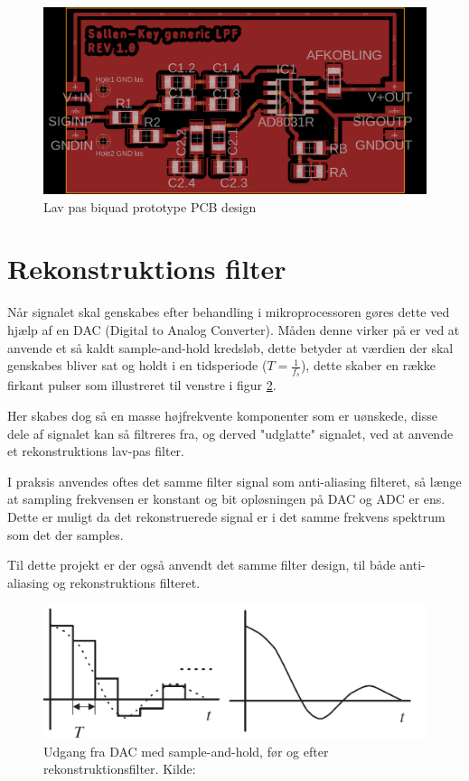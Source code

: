 \begin{figure}[H]
	\centering
	\includegraphics[width=.7\linewidth]{billeder/skbiquadpcb}
	\caption{Lav pas biquad prototype PCB design}
	\label{fig:skbiquadpcb}
\end{figure}

\section{Rekonstruktions filter}

Når signalet skal genskabes efter behandling i mikroprocessoren gøres dette ved hjælp af en DAC (Digital to Analog Converter). 
Måden denne virker på er ved at anvende et så kaldt sample-and-hold kredsløb,
dette betyder at værdien der skal genskabes bliver sat og holdt i en
tidsperiode ($T=\frac{1}{f_s}$), dette skaber en række firkant pulser som
illustreret til venstre i figur \ref{fig:samplholdrecon}.

Her skabes dog så en masse højfrekvente komponenter som er uønskede, disse dele af signalet kan så filtreres fra, og derved "udglatte" signalet, ved at anvende et rekonstruktions lav-pas filter.

I praksis anvendes oftes det samme filter signal som anti-aliasing filteret,
så længe at sampling frekvensen er konstant og bit opløsningen på DAC og ADC
er ens. Dette er muligt da det rekonstruerede signal er i det samme frekvens
spektrum som det der samples.

Til dette projekt er der også anvendt det samme filter design, til både anti-aliasing og rekonstruktions filteret.

\begin{figure}[H]
	\centering
	\includegraphics[width=0.6\linewidth]{billeder/dacrecon}
	\caption{Udgang fra DAC med sample-and-hold, før og efter rekonstruktionsfilter. Kilde:\cite{Tan2013}}
	\label{fig:samplholdrecon}
\end{figure}
